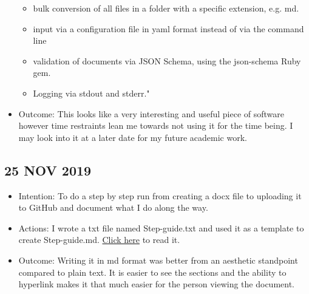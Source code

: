 \documentclass{article}
\begin{document}
\begin{itemize}
\begin{itemize}
        \item bulk conversion of all files in a folder with a specific extension, e.g. md.
        \item input via a configuration file in yaml format instead of via the command line
        \item validation of documents via JSON Schema, using the json-schema Ruby gem.
        \item Logging via stdout and stderr."
    \end{itemize}
    \item Outcome: This looks like a very interesting and useful piece of software however time restraints lean me towards not using it for the time being. I may look into it at a later date for my future academic work.
\end{itemize}

\subsection{25 NOV 2019}

\begin{itemize}

    \item Intention: To do a step by step run from creating a docx file to uploading it to GitHub and document what I do along the way.

    \item Actions: I wrote a txt file named Step-guide.txt and used it as a template to create Step-guide.md. \href{https://github.com/MQ-FOAR705/Version-Control-Supervisor-Feedback-PoC/blob/master/Step-guide.md}{Click here} to read it.
    
    \item Outcome: Writing it in md format was better from an aesthetic standpoint compared to plain text. It is easier to see the sections and the ability to hyperlink makes it that much easier for the person viewing the document.

\end{itemize}
\end{document}

